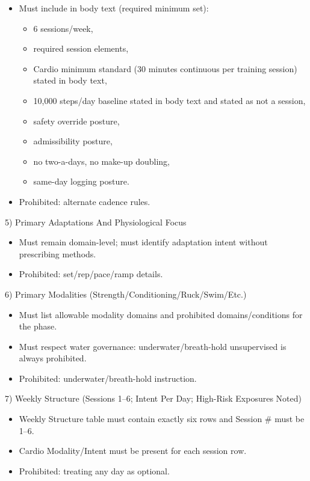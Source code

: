\documentclass[10pt]{article}
\begin{document}
\begin{itemize}
\item Must include in body text (required minimum set):
  \begin{itemize}
  \item 6 sessions/week,
  \item required session elements,
  \item Cardio minimum standard (30 minutes continuous per training session) stated in body text,
  \item 10,000 steps/day baseline stated in body text and stated as not a session,
  \item safety override posture,
  \item admissibility posture,
  \item no two-a-days, no make-up doubling,
  \item same-day logging posture.
  \end{itemize}
\item Prohibited: alternate cadence rules.
\end{itemize}

5) Primary Adaptations And Physiological Focus

\begin{itemize}
\item Must remain domain-level; must identify adaptation intent without prescribing methods.
\item Prohibited: set/rep/pace/ramp details.
\end{itemize}

6) Primary Modalities (Strength/Conditioning/Ruck/Swim/Etc.)

\begin{itemize}
\item Must list allowable modality domains and prohibited domains/conditions for the phase.
\item Must respect water governance: underwater/breath-hold unsupervised is always prohibited.
\item Prohibited: underwater/breath-hold instruction.
\end{itemize}

7) Weekly Structure (Sessions 1–6; Intent Per Day; High-Risk Exposures Noted)

\begin{itemize}
\item Weekly Structure table must contain exactly six rows and Session \# must be 1–6.
\item Cardio Modality/Intent must be present for each session row.
\item Prohibited: treating any day as optional.
\end{itemize}
\end{document}

